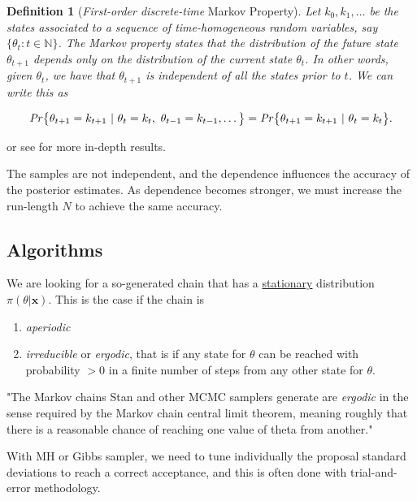 \documentclass[11pt,a4paper,openany ]{book}
\newtheorem{definition}{Definition}[chapter]
\begin{document}
\begin{definition}[\emph{First-order discrete-time} Markov Property]
	Let $k_0,k_1,\dots$ be the states associated to a sequence of time-homogeneous random variables, say $\big\{\theta_t:t\in\mathbb{N}\big\}$.
	The Markov property states that the distribution of the future state $\theta_{t+1}$ depends only on the distribution of the current state $\theta_{t}$. 
	In other words, given $\theta_{t}$, we have that $\theta_{t+1}$ is independent of all the states prior to $t$. We can write this as
	
	\begin{equation}
	\text{\emph{Pr}}\big\{\theta_{t+1}=k_{t+1}\ |\ \theta_t=k_t,\ \theta_{t-1}=k_{t-1},\dots\big\} = \text{\emph{Pr}}\big\{\theta_{t+1}=k_{t+1}\ | \ \theta_t=k_t\big\}.
	\end{equation}
\end{definition} 

or see \citet[section 2.2.3]{angelino_patterns_2016} for more in-depth results.

The samples are not independent, and the dependence influences the accuracy of the posterior estimates. As dependence becomes stronger, we must increase the run-length $N$ to achieve the same accuracy. 


\subsection{Algorithms} 

We are looking for a so-generated chain that has a \underline{stationary} distribution $\pi(\theta|\boldsymbol{x})$. This is the case if the chain is 

\begin{enumerate}
	\item \emph{aperiodic}
	\item \emph{irreducible} or \emph{ergodic}, that is if any state for $\theta$ can be reached with probability $>0$ in a finite number of steps from any other state for $\theta$.
\end{enumerate}

"The Markov chains Stan and other MCMC samplers generate are \emph{ergodic} in the
sense required by the Markov chain central limit theorem, meaning roughly that there
is a reasonable chance of reaching one value of theta from another." \cite{stan_stan_2016}

With MH or Gibbs sampler, we need to tune individually the proposal standard deviations to reach a correct acceptance, and this is often done with trial-and-error methodology. 
\end{document}
